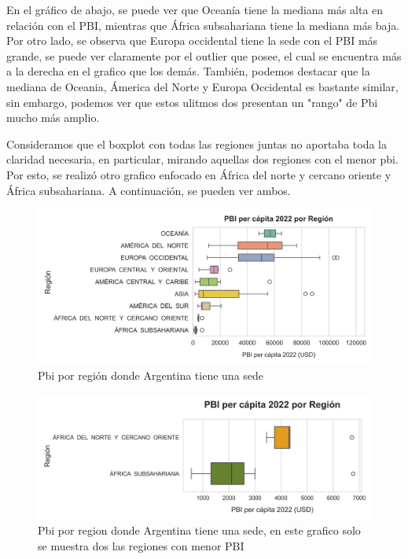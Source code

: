 \documentclass[10pt,a4paper]{article}
\begin{document}
\vspace{12pt}

En el gráfico de abajo, se puede ver que Oceanía tiene la mediana más alta en relación con el PBI, mientras que África subsahariana tiene la mediana más baja. Por otro lado, se observa que Europa occidental tiene la sede con el PBI más grande, se puede ver claramente por el outlier que posee, el cual se encuentra más a la derecha en el grafico que los demás. También, podemos destacar que la mediana de Oceania, Ámerica del Norte y Europa Occidental es bastante similar, sin embargo, podemos ver que estos ulitmos dos presentan un "rango" de Pbi mucho más amplio. \par
Consideramos que el boxplot con todas las regiones juntas no aportaba toda la claridad necesaria, en particular, mirando aquellas dos regiones con el menor pbi. Por esto, se realizó otro grafico enfocado en África del norte y cercano oriente y  África subsahariana. A continuación, se pueden ver ambos.

\newpage

\begin{figure}[!]
  \centering
  \includegraphics[width=1\textwidth]{boxplot_regiones.png}
  \caption{Pbi por región donde Argentina tiene una sede}
  \label{fig:Tabla 2}
\end{figure}

\begin{figure}[!] %
  \centering
  \includegraphics[width=1\textwidth]{boxplot_ultimas.png}
  \caption{ Pbi por region donde Argentina tiene una sede, en este grafico solo se muestra dos las regiones con menor PBI }
  \label{fig:Tabla 2}
\end{figure} \vspace{0.1cm}
\end{document}
